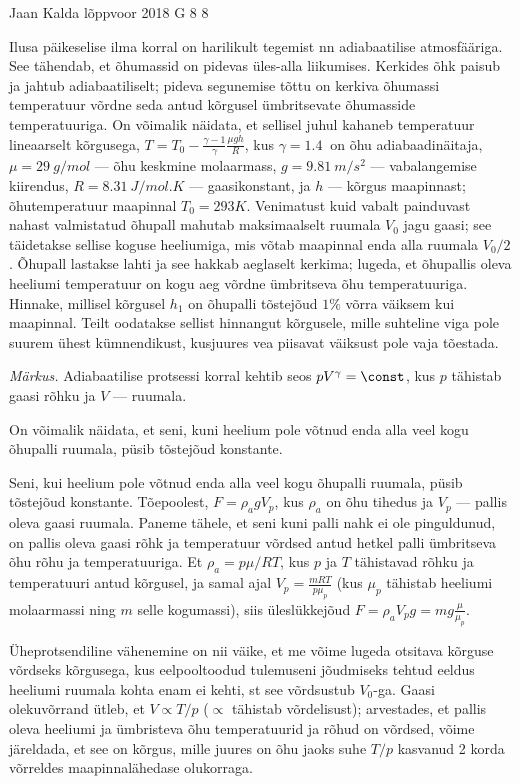 {Jaan Kalda} %
{lõppvoor} %
{2018} %
{G 8} %
{8} %
{
\ifStatement
Ilusa päikeselise ilma korral on harilikult tegemist nn adiabaatilise atmosfääriga. See tähendab, et õhumassid on pidevas üles-alla liikumises. Kerkides õhk paisub ja jahtub adiabaatiliselt; pideva segunemise tõttu on kerkiva õhumassi temperatuur võrdne seda antud kõrgusel ümbritsevate õhumasside temperatuuriga. On võimalik näidata, et sellisel juhul kahaneb temperatuur lineaarselt kõrgusega, $T=T_0-\frac{\gamma-1}\gamma\frac{\mu g h}R$, kus $\gamma=\SI{1.4}{	}$ on õhu adiabaadinäitaja, $\mu=\SI{29}{g/mol}$ --- õhu keskmine molaarmass, $g=\SI{9.81}{m/s^2}$ --- vabalangemise kiirendus, $R=\SI{8.31}{J/mol.K}$ --- gaasikonstant,  ja $h$ --- kõrgus maapinnast; õhutemperatuur maapinnal $T_0=\SI{293}K$. Venimatust kuid vabalt painduvast nahast valmistatud õhupall mahutab maksimaalselt ruumala $V_0$ jagu gaasi; see täidetakse sellise koguse heeliumiga, mis võtab maapinnal enda alla ruumala $V_0/2$. Õhupall lastakse lahti ja see hakkab aeglaselt kerkima; lugeda, et õhupallis oleva heeliumi temperatuur on kogu aeg võrdne ümbritseva õhu temperatuuriga. Hinnake, millisel kõrgusel $h_1$ on õhupalli tõstejõud $1\%$ võrra väiksem kui maapinnal. Teilt oodatakse sellist hinnangut kõrgusele, mille suhteline viga pole suurem ühest kümnendikust, kusjuures vea piisavat väiksust pole vaja tõestada. 

\emph{Märkus.} Adiabaatilise protsessi korral kehtib seos $pV^\gamma = \const$, kus $p$ tähistab gaasi rõhku ja $V$ --- ruumala.
\fi


\ifHint
On võimalik näidata, et seni, kuni heelium pole võtnud enda alla veel kogu õhupalli ruumala, püsib tõstejõud konstante.
\fi


\ifSolution
Seni, kui heelium pole võtnud enda alla veel kogu õhupalli ruumala, püsib tõstejõud konstante. Tõepoolest, $F=\rho_a g V_p$, kus $\rho_a$ on õhu tihedus ja $V_p$ --- pallis oleva gaasi ruumala. Paneme tähele, et seni kuni palli nahk ei ole pinguldunud, on pallis oleva gaasi rõhk ja temperatuur võrdsed antud hetkel palli ümbritseva õhu rõhu ja temperatuuriga. Et $\rho_a=p\mu/RT$, kus $p$ ja $T$ tähistavad rõhku ja temperatuuri antud kõrgusel, ja samal ajal $V_p=\frac {mRT}{p\mu_p}$ (kus $\mu_p$ tähistab heeliumi molaarmassi ning $m$ selle kogumassi), siis üleslükkejõud $F=\rho_a V_p g=mg\frac{\mu}{\mu_p}$. 

Üheprotsendiline vähenemine on nii väike, et me võime lugeda otsitava kõrguse võrdseks kõrgusega, kus eelpooltoodud tulemuseni jõudmiseks tehtud eeldus heeliumi ruumala kohta enam ei kehti, st see võrdsustub $V_0$-ga. Gaasi olekuvõrrand ütleb, et $V\propto T/p$ ($\propto$ tähistab võrdelisust); arvestades, et pallis oleva heeliumi ja ümbristeva õhu temperatuurid ja rõhud on võrdsed, võime järeldada, et see on kõrgus, mille juures on õhu jaoks suhe $T/p$  kasvanud 2 korda võrreldes maapinnalähedase olukorraga. 

}
